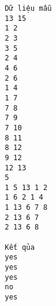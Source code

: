 \begin{verbatim}
Dữ liệu mẫu
13 15
1 2
2 3
3 5
2 4
4 6
2 6
1 4
1 7
7 8
7 9
7 10
8 11
8 12
9 12
12 13
5
1 5 13 1 2
1 6 2 1 4
1 13 6 7 8
2 13 6 7
2 13 6 8

Kết qủa
yes
yes
yes
no
yes
\end{verbatim}